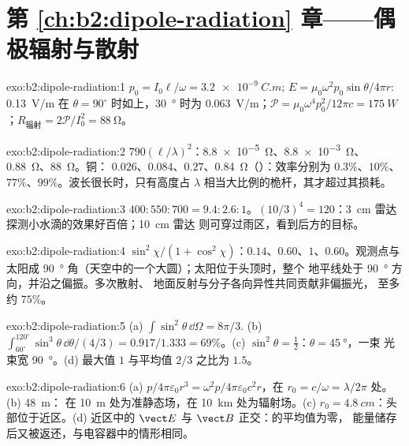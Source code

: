 \section*{第 \ref{ch:b2:dipole-radiation} 章——偶极辐射与散射}

\begin{solution}{exo:b2:dipole-radiation:1}
$p_0 = I_0\ell/\omega = \qty{3.2e-9}{C.m}$; $E = \mu_0\omega^2p_0\sin\theta/4\pi r$: \qty{0.13}{V/m}
在 $\theta = 90^\circ$ 时如上，\qty{30}{\degree} 时为 \qty{0.063}{V/m}；$\mathcal P = \mu_0\omega^4p_0^2/12\pi c =
\qty{175}{W}$；$R_{\text{辐射}} = 2\mathcal P/I_0^2 = \qty{88}{\ohm}$。
\end{solution}

\begin{solution}{exo:b2:dipole-radiation:2}
$790(\ell/\lambda)^2$：\qty{8.8e-5}{\ohm}、\qty{8.8e-3}{\ohm}、\qty{0.88}{\ohm}、\qty{88}{\ohm}。铜：
$0.026$、$0.084$、$0.27$、\qty{0.84}{\ohm}（）：效率分别为 $0.3\%$、$10\%$、
$77\%$、$99\%$。波长很长时，只有高度占
$\lambda$ 相当大比例的桅杆，其才超过其损耗。
\end{solution}

\begin{solution}{exo:b2:dipole-radiation:3}
$400 : 550 : 700 = 9.4 : 2.6 : 1$。$(10/3)^4 = 120$：\qty{3}{cm} 雷达
探测小水滴的效果好百倍；\qty{10}{cm} 雷达
则可穿过雨区，看到后方的目标。
\end{solution}

\begin{solution}{exo:b2:dipole-radiation:4}
$\sin^2\chi/(1 + \cos^2\chi)$：$0.14$、$0.60$、$1$、$0.60$。观测点与太阳成
\qty{90}{\degree} 角（天空中的一个大圆）；太阳位于头顶时，整个
地平线处于 \qty{90}{\degree} 方向，并沿之偏振。多次散射、
地面反射与分子各向异性共同贡献非偏振光，
至多约 $75\%$。
\end{solution}

\begin{solution}{exo:b2:dipole-radiation:5}
(a) $\int\sin^2\theta\,\dd\Omega = 8\pi/3$. (b) $\int_{60^\circ}^{120^\circ}\sin^3\theta\,\dd\theta/
(4/3) = 0.917/1.333 = 69\%$。(c) $\sin^2\theta = \tfrac12$：$\theta = \qty{45}{\degree}$，一束
光束宽 \qty{90}{\degree}。(d) 最大值 $1$ 与平均值 $2/3$ 之比为 $1.5$。
\end{solution}

\begin{solution}{exo:b2:dipole-radiation:6}
(a) $p/4\pi\varepsilon_0r^3 = \omega^2p/4\pi\varepsilon_0c^2r$，在 $r_0 = c/\omega = \lambda/2\pi$ 处。(b) \qty{48}{m}：
在 \qty{10}{m} 处为准静态场，在 \qty{10}{km} 处为辐射场。(c)
$r_0 = \qty{4.8}{cm}$：头部位于近区。(d) 近区中的 $\vect E$
与 $\vect B$ 正交：的平均值为零，
能量储存后又被返还，与电容器中的情形相同。
\end{solution}

